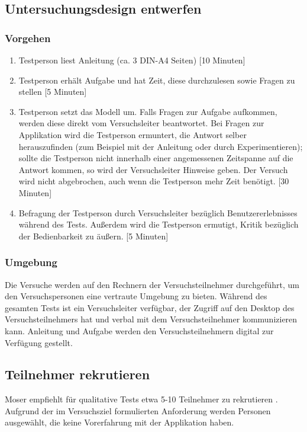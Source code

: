 \subsection{Untersuchungsdesign entwerfen}

\subsubsection*{Vorgehen}
\begin{enumerate}
    \item Testperson liest Anleitung (ca. 3 DIN-A4 Seiten) [10 Minuten]
    \item Testperson erhält Aufgabe und hat Zeit, diese durchzulesen sowie Fragen zu stellen [5 Minuten]
    \item Testperson setzt das Modell um. Falls Fragen zur Aufgabe aufkommen, werden diese direkt vom Versuchsleiter beantwortet. Bei Fragen zur Applikation wird die Testperson ermuntert, die Antwort selber herauszufinden (zum Beispiel mit der Anleitung oder durch Experimentieren); sollte die Testperson nicht innerhalb einer angemessenen Zeitspanne auf die Antwort kommen, so wird der Versuchsleiter Hinweise geben. Der Versuch wird nicht abgebrochen, auch wenn die Testperson mehr Zeit benötigt. [30 Minuten]
    \item Befragung der Testperson durch Versuchsleiter bezüglich Benutzererlebnisses während des Tests. Außerdem wird die Testperson ermutigt, Kritik bezüglich der Bedienbarkeit zu äußern. [5 Minuten]
\end{enumerate}

\subsubsection*{Umgebung}
Die Versuche werden auf den Rechnern der Versuchsteilnehmer durchgeführt, um den Versuchspersonen eine vertraute Umgebung zu bieten. Während des gesamten Tests ist ein Versuchsleiter verfügbar, der Zugriff auf den Desktop des Versuchsteilnehmers hat und verbal mit dem Versuchsteilnehmer kommunizieren kann. Anleitung und Aufgabe werden den Versuchsteilnehmern digital zur Verfügung gestellt.

\subsection{Teilnehmer rekrutieren}

Moser empfiehlt für qualitative Tests etwa 5-10 Teilnehmer zu rekrutieren \cite{Moser2012}. Aufgrund der im Versuchsziel formulierten Anforderung werden Personen ausgewählt, die keine Vorerfahrung mit der Applikation haben.



